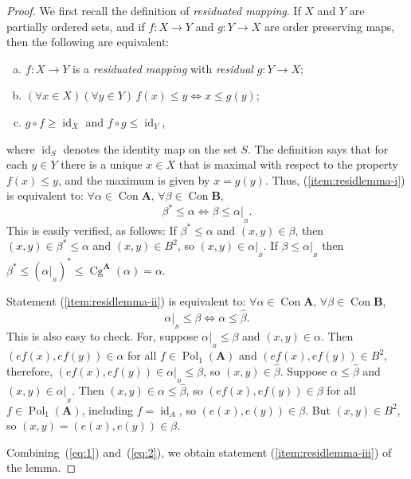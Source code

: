 \documentclass{au}
\numberwithin{equation}{section}
\theoremstyle{plain}
\theoremstyle{definition}
\newcommand{\<}{\ensuremath{\langle}}
\renewcommand{\>}{\ensuremath{\rangle}}
\newcommand{\bA}{\ensuremath{\mathbf{A}}}
\newcommand{\bB}{\ensuremath{\mathbf{B}}}
\DeclareMathOperator{\id}{id}
\DeclareMathOperator{\Cg}{Cg}
\DeclareMathOperator{\Con}{Con}
\DeclareMathOperator{\Pol}{Pol}
\renewcommand{\leq}{\ensuremath{\leqslant}}
\renewcommand{\geq}{\ensuremath{\geqslant}}
\newcommand{\resB}{\ensuremath{|_{_B}}}
\begin{document}
\begin{proof}
  We first recall the definition of {\it residuated mapping}.  If $X$ and $Y$
  are partially ordered sets, and if
$f\colon  X \rightarrow Y$ and
$g\colon  Y \rightarrow X$ are order preserving maps, then the following are
equivalent:
\begin{enumerate}[(a)]
\item $f\colon  X \rightarrow Y$ is a {\it residuated mapping} with {\it residual}
$g\colon  Y \rightarrow X$;
\item %
$(\forall  x\in X)(\forall y\in Y) \, f(x) \leq y \iff x \leq g(y)$;
\item $g\circ f \geq \id_X$ and $f\circ g \leq \id_Y$,
\end{enumerate}
where $\id_S$ denotes the identity map on the set $S$.
The definition says that for each $y\in Y$ there is a unique
$x\in X$ that is maximal with respect to the property $f(x) \leq y$, and the
maximum is given by $x = g(y)$.
Thus, (\ref{item:residlemma-i}) is equivalent to:
$\forall  \alpha \in \Con\bA,\, \forall  \beta \in \Con\bB$,
\begin{equation}
  \label{eq:1}
\beta^* \leq \alpha \iff \beta \leq \alpha\resB.
\end{equation}
This is easily verified, as follows:  If
$\beta^* \leq \alpha$ and $(x,y)\in \beta$, then
$(x,y) \in \beta^* \leq \alpha$
and $(x,y) \in B^2$, so $(x,y)\in
\alpha\resB$.  If $\beta \leq \alpha\resB$ then
$\beta^* \leq (\alpha\resB)^* \leq \Cg^\bA(\alpha) = \alpha$.

Statement (\ref{item:residlemma-ii}) is equivalent to:
$\forall \alpha \in \Con\bA, \, \forall \beta \in \Con\bB$,
\begin{equation}
  \label{eq:2}
\alpha\resB\leq \beta \iff \alpha \leq \widehat{\beta}.
\end{equation}
This is also easy to check.  For, suppose
$\alpha\resB\leq \beta$ and $(x,y)\in \alpha$. Then $(ef(x), ef(y)) \in \alpha$
for all $f \in \Pol_1(\bA)$ and $(ef(x), ef(y)) \in B^2$, therefore,
$(ef(x), ef(y)) \in \alpha\resB \leq \beta$, so $(x,y) \in \widehat{\beta}$.
Suppose $\alpha \leq \widehat{\beta}$ and $(x,y) \in \alpha\resB$.
Then $(x,y) \in \alpha \leq  \widehat{\beta}$, so
$(ef(x), ef(y)) \in \beta$ for all $f\in \Pol_1(\bA)$, including $f=\id_A$, so
$(e(x), e(y)) \in \beta$. But $(x, y) \in B^2$, so $(x, y) = (e(x), e(y)) \in
\beta$.

Combining~(\ref{eq:1}) and~(\ref{eq:2}), we obtain statement (\ref{item:residlemma-iii}) of the lemma.
\end{proof}
\end{document}
